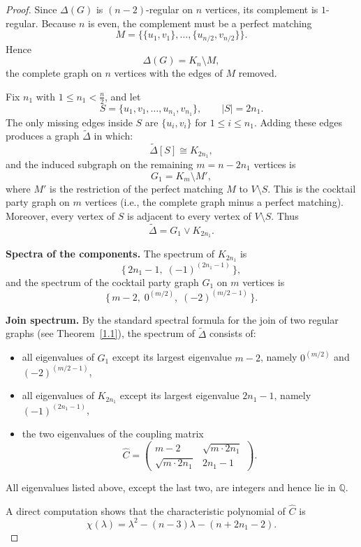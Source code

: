 \documentclass[11pt]{amsart}
\begin{document}
\begin{proof}
Since $\Delta(G)$ is $(n-2)$-regular on $n$ vertices, its complement is $1$-regular. Because $n$ is even, the complement must be a perfect matching
\[
M=\bigl\{\{u_1,v_1\},\dots,\{u_{n/2},v_{n/2}\}\bigr\}.
\]
Hence
\[
\Delta(G)=K_n \setminus M,
\]
the complete graph on $n$ vertices with the edges of $M$ removed. 

Fix $n_1$ with $1\le n_1<\frac{n}{2}$, and let
\[
S=\{u_1,v_1,\dots,u_{n_1},v_{n_1}\}, \qquad |S|=2n_1.
\]
The only missing edges inside $S$ are $\{u_i,v_i\}$ for $1\le i \le n_1$. Adding these edges produces a graph $\widetilde{\Delta}$ in which:
\[
\widetilde{\Delta}[S]\cong K_{2n_1},
\]
and the induced subgraph on the remaining $m=n-2n_1$ vertices is
\[
G_1 = K_m \setminus M',
\]
where $M'$ is the restriction of the perfect matching $M$ to $V\setminus S$. This is the cocktail party graph on $m$ vertices (i.e., the complete graph minus a perfect matching). Moreover, every vertex of $S$ is adjacent to every vertex of $V\setminus S$. Thus
\[
\widetilde{\Delta}=G_1 \vee K_{2n_1}.
\]

\medskip
\noindent\textbf{Spectra of the components.}
The spectrum of $K_{2n_1}$ is
\[
\{\,2n_1-1,\;(-1)^{(2n_1-1)}\,\},
\]
and the spectrum of the cocktail party graph $G_1$ on $m$ vertices is
\[
\{\,m-2,\;0^{(m/2)},\;(-2)^{(m/2-1)}\,\}.
\]

\medskip
\noindent\textbf{Join spectrum.}
By the standard spectral formula for the join of two regular graphs (see Theorem~\ref{1.1}), the spectrum of $\widetilde{\Delta}$ consists of:
\begin{itemize}
    \item all eigenvalues of $G_1$ except its largest eigenvalue $m-2$, namely $0^{(m/2)}$ and $(-2)^{(m/2-1)}$,
    \item all eigenvalues of $K_{2n_1}$ except its largest eigenvalue $2n_1-1$, namely $(-1)^{(2n_1-1)}$,
    \item the two eigenvalues of the coupling matrix
    \[
    \widehat{C}=
    \begin{pmatrix}
        m-2 & \sqrt{m\cdot 2n_1} \\
        \sqrt{m\cdot 2n_1} & 2n_1-1
    \end{pmatrix}.
    \]
\end{itemize}
All eigenvalues listed above, except the last two, are integers and hence lie in $\mathbb{Q}$.

A direct computation shows that the characteristic polynomial of $\widehat{C}$ is
\[
\chi(\lambda)=\lambda^2-(n-3)\lambda-(n+2n_1-2).
\]


\end{proof}
\end{document}
